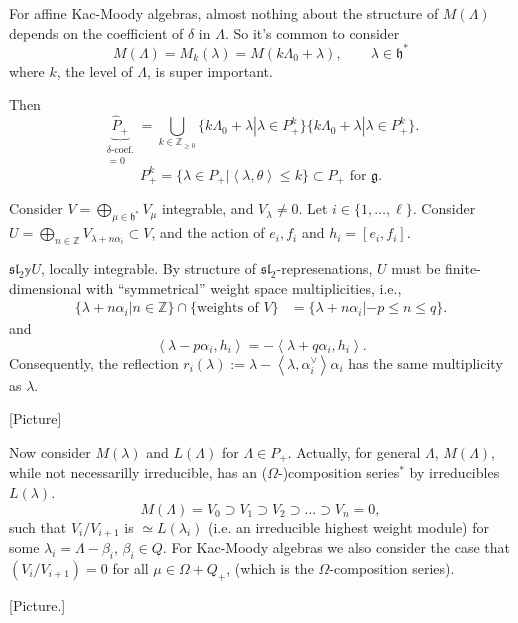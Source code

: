 \begin{remark}
\label{remark-Verma-for-affine-Kac-Moody-algebras-
the-coefficient-of-K-is-super-important}
For affine Kac-Moody algebras, almost nothing about the structure of 
$M(\Lambda)$ depends on the coefficient of $\delta$ in $\Lambda$. 
So it's common to consider
$$
M(\Lambda)=M_k(\lambda)=M(k\Lambda_0+\lambda),\qquad \lambda \in \mathfrak{h}^*
$$
where $k$, the level of $\Lambda$, is super important.
\end{remark}

Then
$$
\underbrace{\hat{P}_+}_{
\substack{\delta\text{-coef.} \\ =0}}
=\bigcup_{k \in \mathbb{Z}_{\geq 0}}
\{k\Lambda_0+\lambda|\lambda \in P_+^k\}
\{k\Lambda_0+\lambda|\lambda \in P_+^k\}.
$$
$$
P_+^k=\{\lambda \in P_+|
\left<\lambda,\theta\right>\leq k\}\subset P_+ \text{ for }\mathfrak{g}.
$$

\medskip\noindent
Consider $V= \bigoplus_{\mu \in \mathfrak{h}^*}V_\mu$ integrable,
and $V_\lambda \neq 0$.
Let $i \in \{1,\ldots,\ell\}$.
Consider $U=\bigoplus_{n \in \mathbb{Z}}V_{\lambda+n\alpha_i}\subset V$,
and the action of $e_i,f_i$ and $h_i=[e_i,f_i]$.

$\mathfrak{sl}_2\mathbb{y}U$, locally integrable. By structure of
$\mathfrak{sl}_2$-represenations, $U$ must be finite-dimensional
with ``symmetrical'' weight space multiplicities, i.e.,
\begin{align*}
\{\lambda+n\alpha_i|n\in\mathbb{Z}\}\cap \{\text{weights of }V\}
&=\{\lambda+n\alpha_i|-p\leq n\leq q\}.
\end{align*}
and
$$
\left<\lambda-p\alpha_i,h_i\right>=-\left<\lambda+q\alpha_i,h_i\right>.
$$
\medskip\noindent
Consequently, the reflection
$r_i(\lambda):=\lambda-\left<\lambda,\alpha_i^\vee\right>\alpha_i$
has the same multiplicity as $\lambda$.

[Picture]

Now consider $M(\lambda)$ and $L(\Lambda)$ for 
$\Lambda \in P_+$.
Actually, for general $\Lambda$, $M(\Lambda)$, while not
necessarilly irreducible, has an
($\Omega$-)composition series$^*$ by 
irreducibles $L(\lambda)$.
$$
M(\Lambda)=V_0 \supset V_1 \supset V_2 \supset \ldots \supset V_n=0,
$$
such that $V_i/V_{i+1}$ is $\simeq L(\lambda_i)$ (i.e. an irreducible highest
weight module) for some $\lambda_i=\Lambda-\beta_i$, $\beta_i \in Q$. For
Kac-Moody algebras we also consider the case that $(V_i/V_{i+1})=0$ for all
$\mu \in \Omega + Q_+$, (which is the $\Omega$-composition series).

[Picture.]

